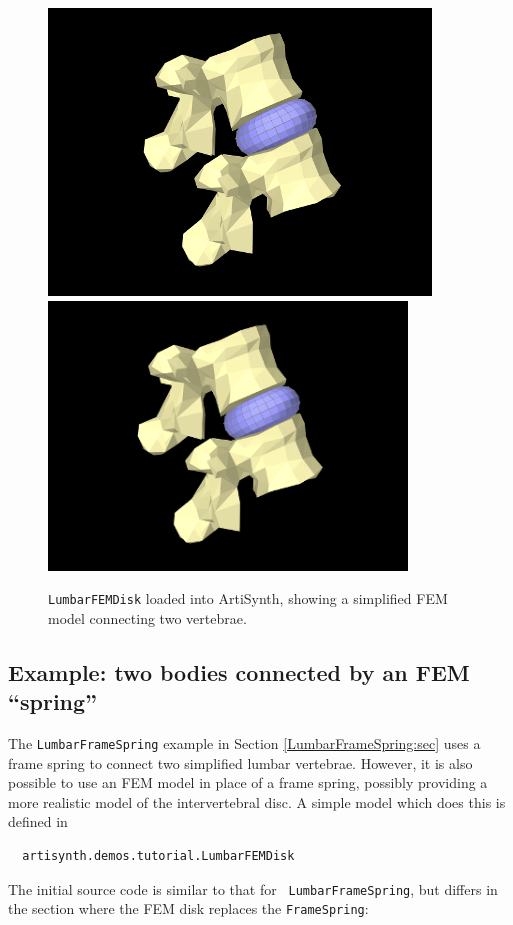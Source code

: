 \begin{figure}[h]
\begin{center}
\iflatexml
 \includegraphics[]{images/LumbarFEMDisk}
\else
 \includegraphics[width=3.75in]{images/LumbarFEMDisk}
\fi
\end{center}
\caption{{\tt LumbarFEMDisk} loaded into ArtiSynth, showing
a simplified FEM model connecting two vertebrae.}
\label{LumbarFEMDisk:fig}
\end{figure}

\subsection{Example: two bodies connected by an FEM ``spring''}
\label{sec:fem:LumarFEMDisk}

The {\tt LumbarFrameSpring} example in
Section \ref{LumbarFrameSpring:sec} uses a frame spring to connect two
simplified lumbar vertebrae. However, it is also possible to use an
FEM model in place of a frame spring, possibly providing a more
realistic model of the intervertebral disc. A simple model which does
this is defined in
%
\begin{verbatim}
  artisynth.demos.tutorial.LumbarFEMDisk
\end{verbatim}
%
The initial source code is similar to that for {\tt
LumbarFrameSpring}, but differs in the section where the FEM disk
replaces the {\tt FrameSpring}:
\lstset{numbers=left}
\iflatexml

\else

\fi
\lstset{numbers=none}

